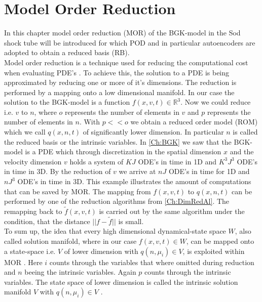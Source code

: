 
\chapter{Model Order Reduction}
\label{Ch:ROM}


In this chapter model order reduction (MOR) of the BGK-model in the Sod shock tube will be introduced for which POD and in particular autoencoders are adopted to obtain a reduced basis (RB).\\
Model order reduction is a technique used for reducing the computational cost when evaluating PDE's \cite{Bernard}\cite{Carlberg}\cite{ohlberger2015reduced}. To achieve this, the solution to a PDE is being approximated by reducing one or more of it's dimensions. The reduction is performed by a mapping onto a low dimensional manifold. In our case the solution to the BGK-model is a function \(f(x,v,t) \in \mathbb{R}^3\). Now we could reduce i.e. \(v\) to \(n\), where \(o\) represents the number of elements in \(v\) and \(p\) represents the number of elements in \(n\). With \(p << o\) we obtain a reduced order model (ROM) which we call \(q(x,n,t)\) of significantly lower dimension. In particular \(n\) is called the reduced basis or the intrinsic variables. In \cref{Ch:BGK} we saw that the BGK-model is a PDE which through discretization in the spatial dimension \(x\) and the velocity dimension \(v\) holds a system of \(KJ\) ODE's in time in 1D and \(K^3J^3\) ODE's in time in 3D.  By the reduction of \(v\) we arrive at \(nJ\) ODE's in time for 1D and \(nJ^3\) ODE's in time in 3D. This example illustrates the amount of computations that can be saved by MOR. The mapping from \(f(x,v,t)\) to \(q(x,n,t)\) can be performed by one of the reduction algorithms from \cref{Ch:DimRedAl}. The remapping back to \(\tilde{f}(x,v,t)\) is carried out by the same algorithm under the condition, that the distance \(||f - \tilde{f}||\) is small.\\
To sum up, the idea that every high dimensional dynamical-state space \(W\), also called solution manifold, where in our case \(f(x,v,t) \in W\), can be mapped onto a state-space i.e. \(V\) of lower dimension with \(q(n,\mu_i) \in V\), is exploited within MOR \cite{ohlberger2015reduced}. Here \(i\) counts through the variables that where omitted during reduction and \(n\) beeing the intrinsic variables. Again \(p\) counts through the intrinsic variables. The state space of lower dimension is called the intrinsic solution manifold \(V\) with \(q(n,\mu_i) \in V\) \cite{Carlberg}.\\

